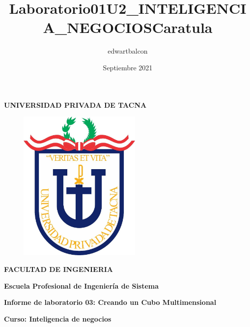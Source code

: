 \documentclass{article}
\title{Laboratorio01U2_INTELIGENCIA_NEGOCIOS}
\author{edwartbalcon}
\date{Septiembre 2021}
\begin{document}
\title{Caratula}

\begin{titlepage}
\begin{center}
\begin{Large}
\textbf{UNIVERSIDAD PRIVADA DE TACNA} \\
\end{Large}
\vspace*{-0.025in}
\begin{figure}[htb]
\begin{center}
\includegraphics[width=6cm]{./images/logo_UPT}
\end{center}
\end{figure}
\vspace*{-0.025in}
\begin{Large}
\textbf{FACULTAD DE INGENIERIA} \\
\end{Large}
\vspace*{0.05in}
\begin{Large}
\textbf{Escuela Profesional de Ingeniería de Sistema} \\
\end{Large}


\vspace*{0.4in}

\vspace*{0.1in}
\begin{Large}
\textbf{Informe de laboratorio 03: Creando un Cubo Multimensional} \\
\end{Large}

\vspace*{0.3in}
\begin{Large}
\textbf{Curso: Inteligencia de negocios} \\
\end{Large}


\end{center}
\end{titlepage}
\end{document}
